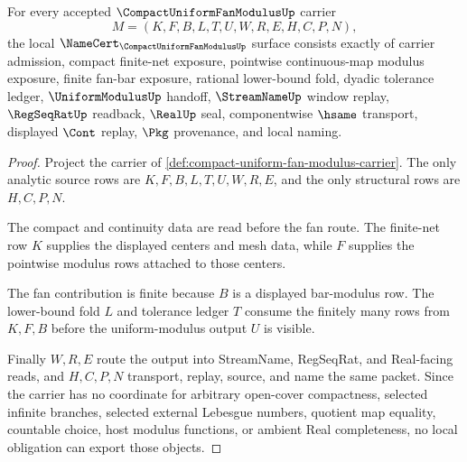 \begin{theorem}
\label{thm:compact-uniform-fan-modulus-namecert-obligations}
For every accepted $\CompactUniformFanModulusUp$ carrier
$$
M=(K,F,B,L,T,U,W,R,E,H,C,P,N),
$$
the local $\NameCert_{\CompactUniformFanModulusUp}$ surface consists exactly of carrier admission, compact finite-net exposure, pointwise continuous-map modulus exposure, finite fan-bar exposure, rational lower-bound fold, dyadic tolerance ledger, $\UniformModulusUp$ handoff, $\StreamNameUp$ window replay, $\RegSeqRatUp$ readback, $\RealUp$ seal, componentwise $\hsame$ transport, displayed $\Cont$ replay, $\Pkg$ provenance, and local naming.
\end{theorem}
\begin{proof}
Project the carrier of \autoref{def:compact-uniform-fan-modulus-carrier}. The only analytic source rows are $K,F,B,L,T,U,W,R,E$, and the only structural rows are $H,C,P,N$.

The compact and continuity data are read before the fan route. The finite-net row $K$ supplies the displayed centers and mesh data, while $F$ supplies the pointwise modulus rows attached to those centers.

The fan contribution is finite because $B$ is a displayed bar-modulus row. The lower-bound fold $L$ and tolerance ledger $T$ consume the finitely many rows from $K,F,B$ before the uniform-modulus output $U$ is visible.

Finally $W,R,E$ route the output into StreamName, RegSeqRat, and Real-facing reads, and $H,C,P,N$ transport, replay, source, and name the same packet. Since the carrier has no coordinate for arbitrary open-cover compactness, selected infinite branches, selected external Lebesgue numbers, quotient map equality, countable choice, host modulus functions, or ambient Real completeness, no local obligation can export those objects.
\end{proof}

